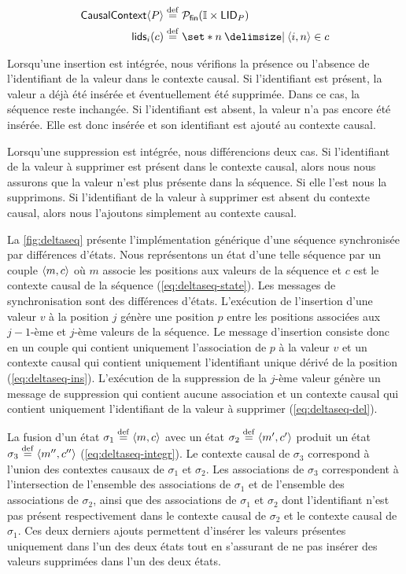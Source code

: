 \begin{align}
\trm{CausalContext}\tuple*{P} &\defeq \powerfset{\mathbb{I} \times \trm{LID}_P}\label{eq:cc-state}\\
\trm{lids}_i(c) &\defeq \set*{n \given \tuple*{i, n} \in c}\label{eq:cc-lids}
\end{align}

Lorsqu'une insertion est intégrée, nous vérifions la présence ou l'absence de l'identifiant de la valeur dans le contexte causal.
Si l'identifiant est présent, la valeur a déjà été insérée et éventuellement été supprimée.
Dans ce cas, la séquence reste inchangée.
Si l'identifiant est absent, la valeur n'a pas encore été insérée.
Elle est donc insérée et son identifiant est ajouté au contexte causal.

Lorsqu'une suppression est intégrée, nous différencions deux cas.
Si l'identifiant de la valeur à supprimer est présent dans le contexte causal, alors nous nous assurons que la valeur n'est plus présente dans la séquence.
Si elle l'est nous la supprimons.
Si l'identifiant de la valeur à supprimer est absent du contexte causal, alors nous l'ajoutons simplement au contexte causal.

La \autoref{fig:deltaseq} présente l'implémentation générique d'une séquence synchronisée par différences d'états.
Nous représentons un état d'une telle séquence par un couple $\tuple*{m, c}$ où $m$ associe les positions aux valeurs de la séquence et $c$ est le contexte causal de la séquence (\autoref{eq:deltaseq-state}).
Les messages de synchronisation sont des différences d'états.
L'exécution de l'insertion d'une valeur $v$ à la position $j$ génère une position $p$ entre les positions associées aux $j-1$-ème et $j$-ème valeurs de la séquence.
Le message d'insertion consiste donc en un couple qui contient uniquement l'association de $p$ à la valeur $v$ et un contexte causal qui contient uniquement l'identifiant unique dérivé de la position (\autoref{eq:deltaseq-ins}).
L'exécution de la suppression de la $j$-ème valeur génère un message de suppression qui contient aucune association et un contexte causal qui contient uniquement l'identifiant de la valeur à supprimer (\autoref{eq:deltaseq-del}).

La fusion d'un état $\sigma_1 \defeq \tuple*{m, c}$ avec un état $\sigma_2 \defeq \tuple*{m', c'}$ produit un état $\sigma_3 \defeq \tuple*{m'', c''}$ (\autoref{eq:deltaseq-integr}).
Le contexte causal de $\sigma_3$ correspond à l'union des contextes causaux de $\sigma_1$ et $\sigma_2$.
Les associations de $\sigma_3$ correspondent à l'intersection de l'ensemble des associations de $\sigma_1$ et de l'ensemble des associations de $\sigma_2$, ainsi que des associations de $\sigma_1$ et $\sigma_2$ dont l'identifiant n'est pas présent respectivement dans le contexte causal de $\sigma_2$ et le contexte causal de $\sigma_1$.
Ces deux derniers ajouts permettent d'insérer les valeurs présentes uniquement dans l'un des deux états tout en s'assurant de ne pas insérer des valeurs supprimées dans l'un des deux états.

